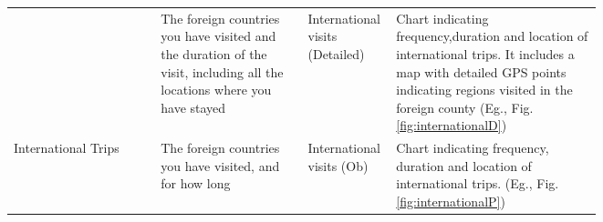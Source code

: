 \begin{table*}[ht!]
\begin{tabularx}{\textwidth}{|l|p{0.25\linewidth}|p{0.15\linewidth}|p{0.35\linewidth}|}
& The foreign countries you have visited and   the duration of the visit, including all the locations where you have stayed    & International visits (Detailed)
& Chart indicating frequency,duration and location of international trips. It includes a map with detailed GPS points indicating regions visited in the foreign county (Eg., Fig. \ref{fig:internationalD})\\ \cline{2-4} 
\multirow{-2}{*}{International Trips \cite{cuebiqInternational} }                & The foreign countries you have visited, and for how long& International visits (Ob)& Chart indicating frequency, duration and location of international trips. (Eg., Fig. \ref{fig:internationalP})                          \\ \cline{1-4} 

\end{tabularx}
\label{tab:listOfFeatures}
\end{table*}